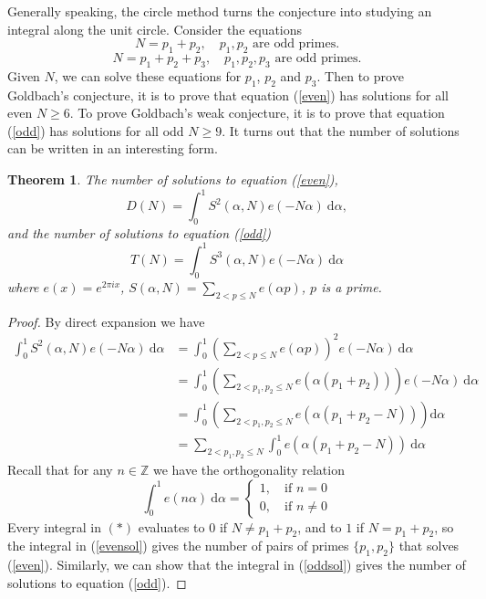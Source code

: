 \documentclass{article}
\newtheorem{theorem}{Theorem}
\begin{document}
Generally speaking, the circle method turns the conjecture into studying an integral along the unit circle. Consider the equations
\begin{equation} \label{even}
        N = p_1 + p_2, \quad p_1, p_2 \text{ are odd primes.}
\end{equation}
\begin{equation} \label{odd}
    N = p_1 + p_2 + p_3, \quad p_1, p_2, p_3 \text{ are odd primes.}
\end{equation}
Given $N$, we can solve these equations for $p_1$, $p_2$ and $p_3$. Then to prove Goldbach's conjecture, it is to prove that equation (\ref{even}) has solutions for all even $N \geq 6$. To prove Goldbach's weak conjecture, it is to prove that equation (\ref{odd}) has solutions for all odd $N \geq 9$. It turns out that the number of solutions can be written in an interesting form.

\begin{theorem}
    The number of solutions to equation (\ref{even}),
\begin{equation}\label{evensol}
    D(N) = \int_0^1S^2(\alpha, N)e(-N\alpha) \ \mathrm{d}\alpha,
\end{equation}
and the number of solutions to equation (\ref{odd})
\begin{equation}\label{oddsol}
    T(N) = \int_0^1S^3(\alpha, N)e(-N\alpha) \ \mathrm{d}\alpha
\end{equation}
where $e(x) = e^{2\pi ix}$, $S(\alpha, N) = \displaystyle \sum_{2 < p \leq N}e(\alpha p)$, $p$ is a prime.
\end{theorem}
\begin{proof}
    By direct expansion we have
\begin{align*}
          \int_0^1S^2(\alpha, N)e(-N\alpha) \ \mathrm{d}\alpha &= \int_0^1 \left(\sum_{2 < p \leq N}e(\alpha p)\right)^2e(-N\alpha) \ \mathrm{d}\alpha\\
         &= \int_0^1 \left(\sum_{2 < p_1, p_2 \leq N}e(\alpha (p_1 + p_2))\right)e(-N\alpha) \ \mathrm{d}\alpha\\
         &= \int_0^1 \left(\sum_{2 < p_1, p_2 \leq N}e(\alpha (p_1 + p_2 - N))\right) \mathrm{d}\alpha \\
         &= \sum_{2 < p_1, p_2 \leq N}\int_0^1 e(\alpha (p_1 + p_2 - N)) \ \mathrm{d}\alpha \tag{$\ast$}
\end{align*}
Recall that for any $n \in \mathbb{Z}$ we have the orthogonality relation
\begin{equation}\label{orth}
    \int_0^1e(n\alpha) \ \mathrm{d}\alpha = \begin{cases}
        1, \quad \text{if $n = 0$}\\ 0, \quad \text{if $n \neq 0$}
    \end{cases}
\end{equation}
Every integral in $(\ast)$ evaluates to $0$ if $N \neq p_1 + p_2$, and to $1$ if $N = p_1 + p_2$, so the integral in 
(\ref{evensol}) gives the number of pairs of primes $\{p_1, p_2\}$ that solves (\ref{even}). Similarly, we can show that the integral in (\ref{oddsol}) gives the number of solutions to equation (\ref{odd}).
\end{proof}
\end{document}
